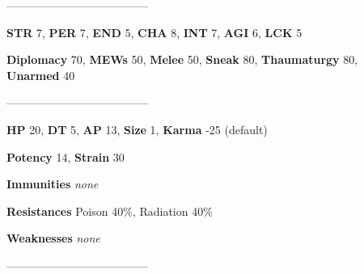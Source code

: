 \documentclass[11pt,a4paper,twocolumn]{book}
\begin{document}
%		
%	
%		
	
				--------------------------------------
	
	\noindent
	\textbf{STR} 7, \textbf{PER} 7, \textbf{END} 5, \textbf{CHA} 8, \textbf{INT} 7, \textbf{AGI} 6, \textbf{LCK} 5
	
	\noindent
	\textbf{Diplomacy} 70, \textbf{MEWs} 50, \textbf{Melee} 50, \textbf{Sneak} 80, \textbf{Thaumaturgy} 80, \textbf{Unarmed} 40	
	
	--------------------------------------
	
	\noindent
	\textbf{HP} 20, \textbf{DT} 5, \textbf{AP} 13, \textbf{Size} 1, \textbf{Karma} -25 (default)
	
	\noindent
	\textbf{Potency} 14, \textbf{Strain} 30
	
	\noindent
	\textbf{Immunities} \emph{none}
	
	\noindent
	\textbf{Resistances} Poison 40\%, Radiation 40\%
	
	\noindent
	\textbf{Weaknesses} \emph{none} %
	
	--------------------------------------
	
\end{document}
